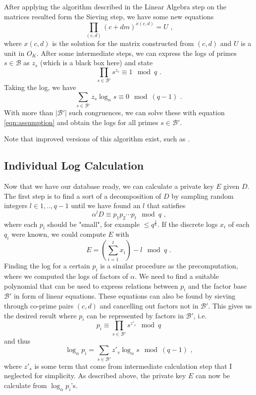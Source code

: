 \documentclass[paper=a4, fontsize=11pt]{scrartcl} %
\numberwithin{equation}{section} %
\numberwithin{figure}{section} %
\numberwithin{table}{section} %
\begin{document}
After applying the algorithm described in the Linear Algebra step on the matrices resulted form the Sieving step, we have some new equations
\begin{equation}
\prod_{(c,d)}(c+dm)^{x(c,d)} = U
\textit{ ,}
\end{equation}
where $x(c,d)$ is the solution for the matrix constructed from $(c,d)$ and $U$ is a unit in $O_K$. After some intermediate steps, we can express the logs of primes $s\in\mathcal{B}$ as $z_s$ (which is a black box here) and state
\begin{equation}
\prod_{s\in\mathcal{B}'}s^{z_s}\equiv 1\mod q
\text{ .}
\end{equation}
Taking the log, we have
\begin{equation}
\sum_{s\in\mathcal{B}'}z_s\log_\alpha s \equiv 0 \mod (q-1)
\text{ .}
\end{equation}
With more than $|\mathcal{B}'|$ such congruences, we can solve these with equation \ref{eqn:assumption} and obtain the logs for all primes $s\in\mathcal{B}'$.

Note that improved versions of this algorithm exist, such as \citep{joux2003improvements}.

\subsection{Individual Log Calculation}
Now that we have our database ready, we can calculate a private key $E$ given $D$. The first step is to find a sort of a decomposition of $D$ by sampling random integers $l\in{1,..,q-1}$ until we have found an $l$ that satisfies
\begin{equation}
\alpha^lD\equiv p_1p_2\cdots p_t\mod q
\text{ ,}
\end{equation}
where each $p_i$ should be "small", for example $\leq q^\frac{1}{k}$. If the discrete logs $x_i$ of each $q_i$ were known, we could compute $E$ with
\begin{equation}
E = \left(\sum_{i=1}^{t}x_i\right)-l \mod q
\text{ .}
\end{equation}
Finding the log for a certain $p_i$ is a similar procedure as the precomputation, where we computed the logs of factors of $\alpha$. We need to find a suitable polynomial that can be used to express relations between $p_i$ and the factor base $\mathcal{B}'$ in form of linear equations. These equations can also be found by sieving through co-prime pairs $(c,d)$ and cancelling out factors not in $\mathcal{B}'$. This gives us the desired result where $p_i$ can be represented by factors in $\mathcal{B}'$, i.e.
\begin{equation}
p_i \equiv \prod_{s\in\mathcal{B}'}s^{z'_s} \mod q
\end{equation}
and thus
\begin{equation}
\log_{\alpha}p_i = \sum_{s\in\mathcal{B}'}z'_s\log_{\alpha}s \mod (q-1)
\text{ ,}
\end{equation}
where $z'_s$ is some term that come from intermediate calculation step that I neglected for simplicity. As described above, the private key $E$ can now be calculate from $\log_{\alpha}p_i$'s.
\end{document}
